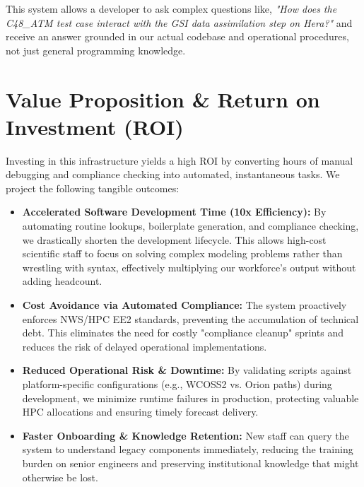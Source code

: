 \documentclass[10pt]{article}
\begin{document}
This system allows a developer to ask complex questions like, \textit{"How does the C48\_ATM test case interact with the GSI data assimilation step on Hera?"} and receive an answer grounded in our actual codebase and operational procedures, not just general programming knowledge.

\section*{Value Proposition \& Return on Investment (ROI)}
Investing in this infrastructure yields a high ROI by converting hours of manual debugging and compliance checking into automated, instantaneous tasks. We project the following tangible outcomes:

\begin{itemize}
    \item \textbf{Accelerated Software Development Time (10x Efficiency):} By automating routine lookups, boilerplate generation, and compliance checking, we drastically shorten the development lifecycle. This allows high-cost scientific staff to focus on solving complex modeling problems rather than wrestling with syntax, effectively multiplying our workforce's output without adding headcount.
    \item \textbf{Cost Avoidance via Automated Compliance:} The system proactively enforces NWS/HPC EE2 standards, preventing the accumulation of technical debt. This eliminates the need for costly "compliance cleanup" sprints and reduces the risk of delayed operational implementations.
    \item \textbf{Reduced Operational Risk \& Downtime:} By validating scripts against platform-specific configurations (e.g., WCOSS2 vs. Orion paths) during development, we minimize runtime failures in production, protecting valuable HPC allocations and ensuring timely forecast delivery.
    \item \textbf{Faster Onboarding \& Knowledge Retention:} New staff can query the system to understand legacy components immediately, reducing the training burden on senior engineers and preserving institutional knowledge that might otherwise be lost.
\end{itemize}
\end{document}
